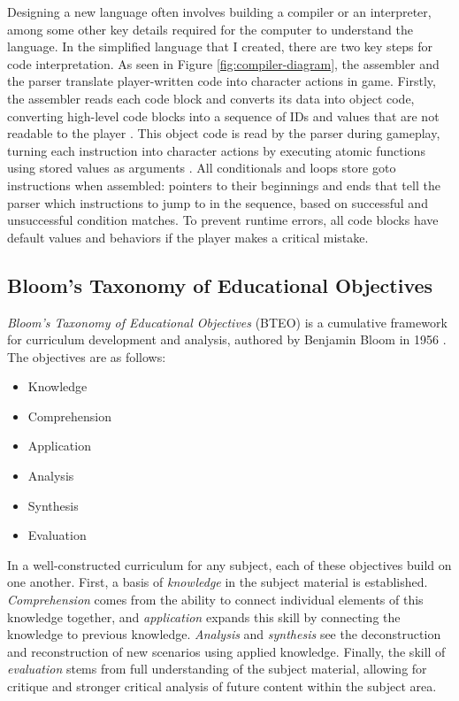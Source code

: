 \documentclass[10pt,twocolumn]{article}
\begin{document}
Designing a new language often involves building a compiler or an interpreter, among some other key details required for the computer to understand the language. In the simplified language that I created, there are two key steps for code interpretation. As seen in Figure \ref{fig:compiler-diagram}, the assembler and the parser translate player-written code into character actions in game. Firstly, the assembler reads each code block and converts its data into object code, converting high-level code blocks into a sequence of IDs and values that are not readable to the player \cite{assembly-textbook}. This object code is read by the parser during gameplay, turning each instruction into character actions by executing atomic functions using stored values as arguments \cite{compiler-textbook}. All conditionals and loops store goto instructions when assembled: pointers to their beginnings and ends that tell the parser which instructions to jump to in the sequence, based on successful and unsuccessful condition matches. To prevent runtime errors, all code blocks have default values and behaviors if the player makes a critical mistake.

\subsection{Bloom's Taxonomy of Educational Objectives}
\textit{Bloom’s Taxonomy of Educational Objectives} (BTEO) is a cumulative framework for curriculum development and analysis, authored by Benjamin Bloom in 1956 \cite{bloom-taxonomy}. The objectives are as follows:

\begin{itemize}
    \item Knowledge
    \item Comprehension
    \item Application
    \item Analysis
    \item Synthesis
    \item Evaluation
\end{itemize}

In a well-constructed curriculum for any subject, each of these objectives build on one another. First, a basis of \textit{knowledge} in the subject material is established. \textit{Comprehension} comes from the ability to connect individual elements of this knowledge together, and \textit{application} expands this skill by connecting the knowledge to previous knowledge. \textit{Analysis} and \textit{synthesis} see the deconstruction and reconstruction of new scenarios using applied knowledge. Finally, the skill of \textit{evaluation} stems from full understanding of the subject material, allowing for critique and stronger critical analysis of future content within the subject area. 
\end{document}
